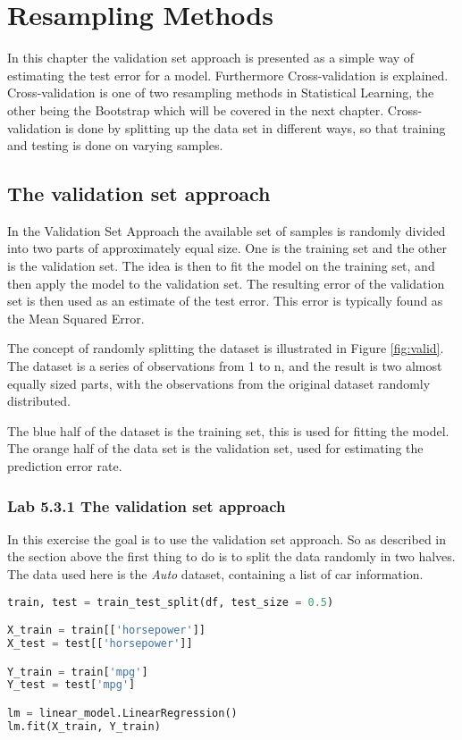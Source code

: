 \chapter{Resampling Methods}
\label{chp:crossvalidation}
In this chapter the validation set approach is presented as a simple way of estimating the test error for a model. Furthermore Cross-validation  is explained. Cross-validation is one of two resampling methods in Statistical Learning, the other being the Bootstrap which will be covered in the next chapter. Cross-validation is done by splitting up the data set in different ways, so that training and testing is done on varying samples. 

\section{The validation set approach}
\label{sec:VSA}
In the Validation Set Approach the available set of samples is randomly divided into two parts of approximately equal size. One is the training set and the other is the validation set. The idea is then to fit the model on the training set, and then apply the model to the validation set. The resulting error of the validation set is then used as an estimate of the test error. This error is typically found as the Mean Squared Error. 


The concept of randomly splitting the dataset is illustrated in Figure \ref{fig:valid}. The dataset is a series of observations from 1 to n, and the result is two almost equally sized parts, with the observations from the original dataset randomly distributed. 

The blue half of the dataset is the training set, this is used for fitting the model. The orange half of the data set is the validation set, used for estimating the prediction error rate.


\subsection{Lab 5.3.1 The validation set approach}
In this exercise the goal is to use the validation set approach. So as described in the section above the first thing to do is to split the data randomly in two halves. The data used here is the \emph{Auto} dataset, containing a list of car information. 

\begin{lstlisting}[language=Python, label=lst:fit_valid, caption=Fit linear regression]
train, test = train_test_split(df, test_size = 0.5)

X_train = train[['horsepower']]
X_test = test[['horsepower']]

Y_train = train['mpg']
Y_test = test['mpg']

lm = linear_model.LinearRegression()
lm.fit(X_train, Y_train)
\end{lstlisting}


